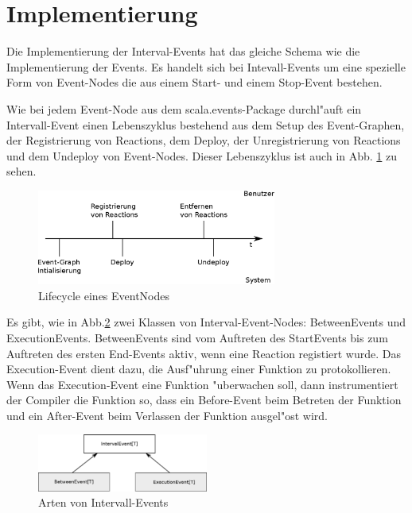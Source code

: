 \section{Implementierung}

Die Implementierung der Interval-Events hat das gleiche Schema wie die
Implementierung der Events. Es handelt sich bei Intevall-Events um eine
spezielle Form von Event-Nodes die aus einem Start- und einem Stop-Event
bestehen.

Wie bei jedem Event-Node aus dem scala.events-Package durchl"auft ein
Intervall-Event einen Lebenszyklus bestehend aus dem Setup des Event-Graphen,
der Registrierung von Reactions, dem Deploy, der Unregistrierung von Reactions
und dem Undeploy von Event-Nodes. Dieser Lebenszyklus ist auch in
Abb. \ref{event_node_lifecycle} zu sehen.

\begin{figure}[htp]
\begin{center}
  \includegraphics[width=0.7\textwidth]{graphics/EventNode-Lifecycle}
  \caption{Lifecycle eines EventNodes}
  \label{event_node_lifecycle}
\end{center}
\end{figure}


Es gibt, wie in Abb.\ref{interval_events_structure} zwei Klassen von
Interval-Event-Nodes: BetweenEvents und ExecutionEvents. BetweenEvents sind vom
Auftreten des StartEvents bis zum Auftreten des ersten End-Events aktiv, wenn
eine Reaction registiert wurde. Das Execution-Event dient dazu, die Ausf"uhrung
einer Funktion zu protokollieren. Wenn das Execution-Event eine Funktion
"uberwachen soll, dann instrumentiert der Compiler die Funktion so, dass ein
Before-Event beim Betreten der Funktion und ein After-Event beim Verlassen der
Funktion ausgel"ost wird.

\begin{figure}[htp]
\begin{center}
  \includegraphics[width=0.5\textwidth]{graphics/interval_event_structure}
  \caption{Arten von Intervall-Events}
  \label{interval_events_structure}
\end{center}
\end{figure}


